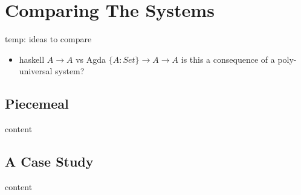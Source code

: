\chapter{Comparing The Systems}
	temp: ideas to compare
	\begin{itemize}
		\item haskell $A \to A$ vs Agda $\{A : Set\} \to A \to A$ is this a consequence of a poly-universal system?
	\end{itemize}
	
	\section{Piecemeal}
	content
	
	\section{A Case Study}
	content